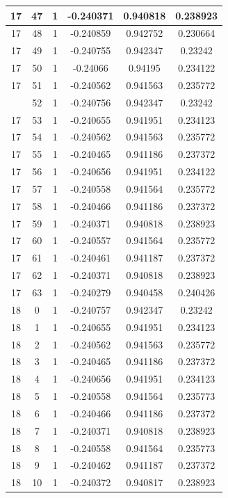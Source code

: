 \documentclass[12pt,a4paper]{article}
\numberwithin{equation}{section}
\numberwithin{figure}{section}
\numberwithin{table}{section}
\begin{document}
\begin{longtable}{|c|c|c|c|c|c|}
17 & 47 & 1 & -0.240371 & 0.940818 & 0.238923 \\ \hline
17 & 48 & 1 & -0.240859 & 0.942752 & 0.230664 \\ \hline
17 & 49 & 1 & -0.240755 & 0.942347 & 0.23242 \\ \hline
17 & 50 & 1 & -0.24066 & 0.94195 & 0.234122 \\ \hline
17 & 51 & 1 & -0.240562 & 0.941563 & 0.235772 \\ \hline
\pagebreak
17 & 52 & 1 & -0.240756 & 0.942347 & 0.23242 \\ \hline
17 & 53 & 1 & -0.240655 & 0.941951 & 0.234123 \\ \hline
17 & 54 & 1 & -0.240562 & 0.941563 & 0.235772 \\ \hline
17 & 55 & 1 & -0.240465 & 0.941186 & 0.237372 \\ \hline
17 & 56 & 1 & -0.240656 & 0.941951 & 0.234122 \\ \hline
17 & 57 & 1 & -0.240558 & 0.941564 & 0.235772 \\ \hline
17 & 58 & 1 & -0.240466 & 0.941186 & 0.237372 \\ \hline
17 & 59 & 1 & -0.240371 & 0.940818 & 0.238923 \\ \hline
17 & 60 & 1 & -0.240557 & 0.941564 & 0.235772 \\ \hline
17 & 61 & 1 & -0.240461 & 0.941187 & 0.237372 \\ \hline
17 & 62 & 1 & -0.240371 & 0.940818 & 0.238923 \\ \hline
17 & 63 & 1 & -0.240279 & 0.940458 & 0.240426 \\ \hline
18 & 0 & 1 & -0.240757 & 0.942347 & 0.23242 \\ \hline
18 & 1 & 1 & -0.240655 & 0.941951 & 0.234123 \\ \hline
18 & 2 & 1 & -0.240562 & 0.941563 & 0.235772 \\ \hline
18 & 3 & 1 & -0.240465 & 0.941186 & 0.237372 \\ \hline
18 & 4 & 1 & -0.240656 & 0.941951 & 0.234123 \\ \hline
18 & 5 & 1 & -0.240558 & 0.941564 & 0.235773 \\ \hline
18 & 6 & 1 & -0.240466 & 0.941186 & 0.237372 \\ \hline
18 & 7 & 1 & -0.240371 & 0.940818 & 0.238923 \\ \hline
18 & 8 & 1 & -0.240558 & 0.941564 & 0.235773 \\ \hline
18 & 9 & 1 & -0.240462 & 0.941187 & 0.237372 \\ \hline
18 & 10 & 1 & -0.240372 & 0.940817 & 0.238923 \\ \hline

\end{longtable}
\end{document}
